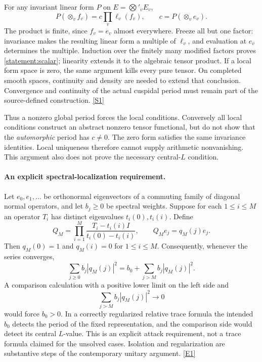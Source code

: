 \documentclass[11pt,a4paper]{article}
\newcommand{\sref}[2]{\hyperlink{source:#1:#2}{[S#2]}}
\newcommand{\eref}[2]{\hyperlink{extra:#1:#2}{[E#2]}}
\numberwithin{equation}{section}
\begin{document}
For any invariant linear form $P$ on $E=\bigotimes'_vE_v$,
\begin{equation}\label{statement:scalar}
 P(\otimes_v f_v)=c\prod_v\ell_v(f_v),\qquad c=P(\otimes_v e_v).
\end{equation}
The product is finite, since $f_v=e_v$ almost everywhere. Freeze all but
one factor: invariance makes the resulting linear form a multiple of
$\ell_v$, and evaluation at $e_v$ determines the multiple. Induction over
the finitely many modified factors proves \eqref{statement:scalar}; linearity
extends it to the algebraic tensor product. If a local form space is zero,
the same argument kills every pure tensor. On completed smooth spaces,
continuity and density are needed to extend that conclusion. Convergence
and continuity of the actual cuspidal period must remain part of the
source-defined construction. \sref{statement}{1}

Thus a nonzero global period forces the local conditions. Conversely all
local conditions construct an abstract nonzero tensor functional, but do
not show that the \emph{automorphic} period has $c\ne0$. The zero form
satisfies the same invariance identities. Local uniqueness therefore cannot
supply arithmetic nonvanishing. This argument also does not prove the
necessary central-$L$ condition.

\paragraph{An explicit spectral-localization requirement.}
Let $e_0,e_1,\ldots$ be orthonormal eigenvectors of a commuting family of
diagonal normal operators, and let $b_j\ge0$ be spectral weights. Suppose
for each $1\le i\le M$ an operator $T_i$ has distinct eigenvalues
$t_i(0),t_i(i)$. Define
\[
 Q_M=\prod_{i=1}^M\frac{T_i-t_i(i)I}{t_i(0)-t_i(i)},
 \qquad Q_Me_j=q_M(j)e_j.
\]
Then $q_M(0)=1$ and $q_M(i)=0$ for $1\le i\le M$. Consequently, whenever
the series converges,
\begin{equation}\label{statement:filter}
 \sum_{j\ge0}b_j|q_M(j)|^2
       =b_0+\sum_{j>M}b_j|q_M(j)|^2.
\end{equation}
A comparison calculation with a positive lower limit on the left side and
\[
 \sum_{j>M}b_j|q_M(j)|^2\longrightarrow0
\]
would force $b_0>0$. In a correctly regularized relative trace formula the
intended $b_0$ detects the period of the fixed representation, and the
comparison side would detect its central $L$-value. This is an explicit
attack requirement, not a trace formula claimed for the unsolved cases.
Isolation and regularization are substantive steps of the contemporary
unitary argument. \eref{statement}{1}
\end{document}
